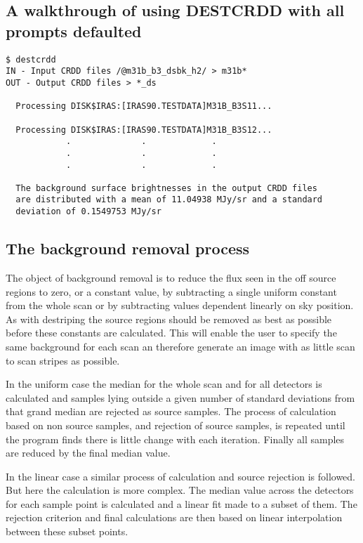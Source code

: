 \subsection{A walkthrough of using DESTCRDD with all prompts defaulted}
\begin{small}
\begin{verbatim}
$ destcrdd 
IN - Input CRDD files /@m31b_b3_dsbk_h2/ > m31b*
OUT - Output CRDD files > *_ds

  Processing DISK$IRAS:[IRAS90.TESTDATA]M31B_B3S11...

  Processing DISK$IRAS:[IRAS90.TESTDATA]M31B_B3S12...
            .              .             .
            .              .             .
            .              .             .

  The background surface brightnesses in the output CRDD files
  are distributed with a mean of 11.04938 MJy/sr and a standard
  deviation of 0.1549753 MJy/sr
\end{verbatim}
\end{small}
\subsection{The background removal process}
The object of background removal is to reduce the flux seen in the off source
regions to zero, or a constant value, by subtracting a single uniform constant 
from the whole scan or by subtracting values dependent linearly on sky 
position. As with destriping the source regions should be removed as best as 
possible before these constants are calculated. This will enable the user to
specify the same background for each scan an therefore generate an image with
as little scan to scan stripes as possible.

In the uniform case the median for the whole scan and for all detectors is
calculated and samples lying outside a given number of standard deviations 
from that grand median are rejected as source samples. The process of 
calculation based on non source samples, and rejection of source samples,
is repeated until the program finds there is little change with each iteration.
Finally all samples are reduced by the final median value.

In the linear case a similar process of calculation and source rejection 
is followed. But here the calculation is more complex. The median value across
the detectors for each sample  point is calculated and a linear fit made to
a subset of them. The rejection criterion and final calculations are then based 
on linear interpolation between these subset points.
